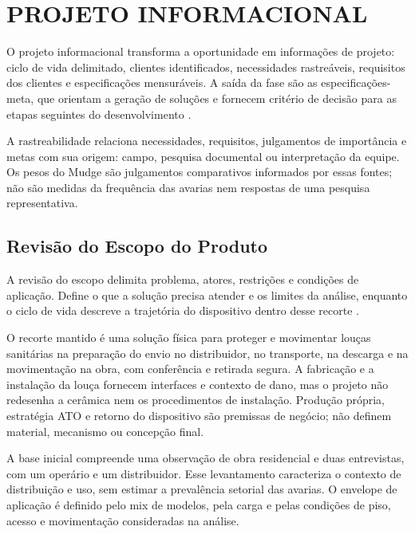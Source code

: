 \clearpage
\section{PROJETO INFORMACIONAL}

O projeto informacional transforma a oportunidade em informações de projeto: ciclo de vida delimitado, clientes identificados, necessidades rastreáveis, requisitos dos clientes e especificações mensuráveis. A saída da fase são as especificações-meta, que orientam a geração de soluções e fornecem critério de decisão para as etapas seguintes do desenvolvimento \citep{rozenfeld2006,back2008}.

A rastreabilidade relaciona necessidades, requisitos, julgamentos de importância e metas com sua origem: campo, pesquisa documental ou interpretação da equipe. Os pesos do Mudge são julgamentos comparativos informados por essas fontes; não são medidas da frequência das avarias nem respostas de uma pesquisa representativa.

\subsection{Revisão do Escopo do Produto}
\label{sec:revisao-escopo}

A revisão do escopo delimita problema, atores, restrições e condições de aplicação. Define o que a solução precisa atender e os limites da análise, enquanto o ciclo de vida descreve a trajetória do dispositivo dentro desse recorte \citep{rozenfeld2006,back2008}.

O recorte mantido é uma solução física para proteger e movimentar louças sanitárias na preparação do envio no distribuidor, no transporte, na descarga e na movimentação na obra, com conferência e retirada segura. A fabricação e a instalação da louça fornecem interfaces e contexto de dano, mas o projeto não redesenha a cerâmica nem os procedimentos de instalação. Produção própria, estratégia ATO e retorno do dispositivo são premissas de negócio; não definem material, mecanismo ou concepção final.

A base inicial compreende uma observação de obra residencial e duas entrevistas, com um operário e um distribuidor. Esse levantamento caracteriza o contexto de distribuição e uso, sem estimar a prevalência setorial das avarias. O envelope de aplicação é definido pelo mix de modelos, pela carga e pelas condições de piso, acesso e movimentação consideradas na análise.


